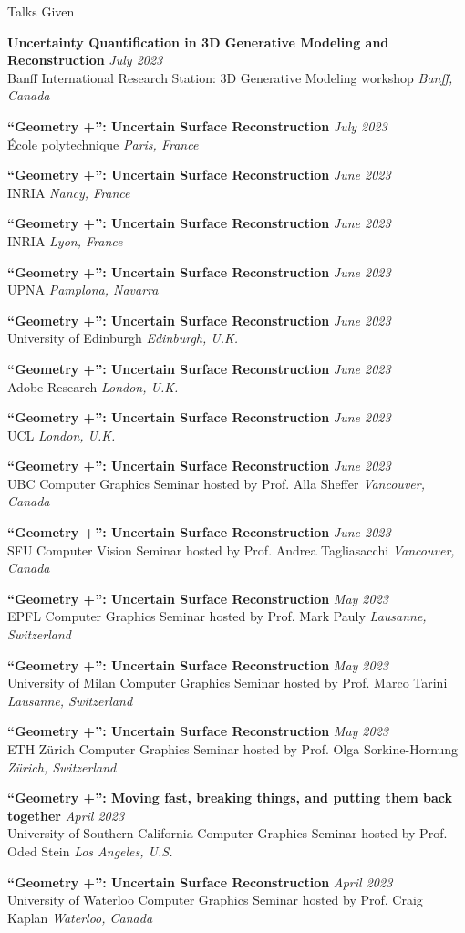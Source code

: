 \documentclass{resume}
\newcommand{\talk}[4]{
    {\bf #1} \hfill {\em \small #2} \\ %
    {\small #3} \hfill {\em \small #4}
}
\begin{document}
\begin{rSection}{Talks Given}



\talk{Uncertainty Quantification in 3D Generative Modeling and Reconstruction}{July 2023}{Banff International Research Station: 3D Generative Modeling workshop}{Banff, Canada}

\talk{``Geometry +'': Uncertain Surface Reconstruction}{July 2023}{École polytechnique}{Paris, France}
    
\talk{``Geometry +'': Uncertain Surface Reconstruction}{June 2023}{INRIA}{Nancy, France}

\talk{``Geometry +'': Uncertain Surface Reconstruction}{June 2023}{INRIA}{Lyon, France}

\talk{``Geometry +'': Uncertain Surface Reconstruction}{June 2023}{UPNA}{Pamplona, Navarra}

\talk{``Geometry +'': Uncertain Surface Reconstruction}{June 2023}{University of Edinburgh}{Edinburgh, U.K.}


\talk{``Geometry +'': Uncertain Surface Reconstruction}{June 2023}{Adobe Research}{London, U.K.}

\talk{``Geometry +'': Uncertain Surface Reconstruction}{June 2023}{UCL}{London, U.K.}

\talk{``Geometry +'': Uncertain Surface Reconstruction}{June 2023}{UBC Computer Graphics Seminar hosted by Prof. Alla Sheffer}{Vancouver, Canada}

\talk{``Geometry +'': Uncertain Surface Reconstruction}{June 2023}{SFU Computer Vision Seminar hosted by Prof. Andrea Tagliasacchi}{Vancouver, Canada}

\talk{``Geometry +'': Uncertain Surface Reconstruction}{May 2023}{EPFL Computer Graphics Seminar hosted by Prof. Mark Pauly}{Lausanne, Switzerland}

\talk{``Geometry +'': Uncertain Surface Reconstruction}{May 2023}{University of Milan Computer Graphics Seminar hosted by Prof. Marco Tarini}{Lausanne, Switzerland}

\talk{``Geometry +'': Uncertain Surface Reconstruction}{May 2023}{ETH Z\"{u}rich Computer Graphics Seminar hosted by Prof. Olga Sorkine-Hornung}{Z\"{u}rich, Switzerland}

\talk{``Geometry +'': Moving fast, breaking things, and putting them back together}{April 2023}{University of Southern California Computer Graphics Seminar hosted by Prof. Oded Stein}{Los Angeles, U.S.}

\talk{``Geometry +'': Uncertain Surface Reconstruction}{April 2023}{University of Waterloo Computer Graphics Seminar hosted by Prof. Craig Kaplan}{Waterloo, Canada}


\end{rSection}
\end{document}
